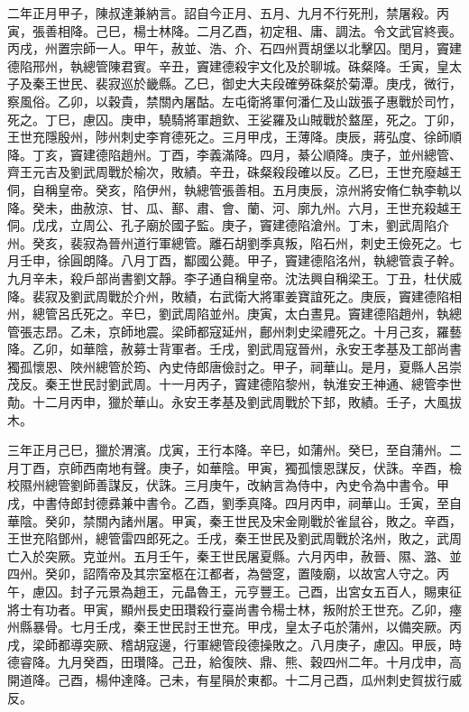 \begin{pinyinscope}
 二年正月甲子，陳叔達兼納言。詔自今正月、五月、九月不行死刑，禁屠殺。丙寅，張善相降。己巳，楊士林降。二月乙酉，初定租、庸、調法。令文武官終喪。丙戌，州置宗師一人。甲午，赦並、浩、介、石四州賈胡堡以北擊囚。閏月，竇建德陷邢州，執總管陳君賓。辛丑，竇建德殺宇文化及於聊城。硃粲降。壬寅，皇太子及秦王世民、裴寂巡於畿縣。乙巳，御史大夫段確勞硃粲於菊潭。庚戌，微行，察風俗。乙卯，以穀貴，禁關內屠酤。左屯衛將軍何潘仁及山跋張子惠戰於司竹，死之。丁巳，慮囚。庚申，驍騎將軍趙欽、王娑羅及山賊戰於盩厔，死之。丁卯，王世充隱殷州，陟州刺史李育德死之。三月甲戌，王薄降。庚辰，蔣弘度、徐師順降。丁亥，竇建德陷趙州。丁酉，李義滿降。四月，綦公順降。庚子，並州總管、齊王元吉及劉武周戰於榆次，敗績。辛丑，硃粲殺段確以反。乙巳，王世充廢越王侗，自稱皇帝。癸亥，陷伊州，執總管張善相。五月庚辰，涼州將安脩仁執李軌以降。癸未，曲赦涼、甘、瓜、鄯、肅、會、蘭、河、廓九州。六月，王世充殺越王侗。戊戌，立周公、孔子廟於國子監。庚子，竇建德陷滄州。丁未，劉武周陷介州。癸亥，裴寂為晉州道行軍總管。離石胡劉季真叛，陷石州，刺史王儉死之。七月壬申，徐圓朗降。八月丁酉，酅國公薨。甲子，竇建德陷洺州，執總管袁子幹。九月辛未，殺戶部尚書劉文靜。李子通自稱皇帝。沈法興自稱梁王。丁丑，杜伏威降。裴寂及劉武周戰於介州，敗績，右武衛大將軍姜寶誼死之。庚辰，竇建德陷相州，總管呂氏死之。辛巳，劉武周陷並州。庚寅，太白晝見。竇建德陷趙州，執總管張志昂。乙未，京師地震。梁師都寇延州，鄜州刺史梁禮死之。十月己亥，羅藝降。乙卯，如華陰，赦募士背軍者。壬戌，劉武周寇晉州，永安王孝基及工部尚書獨孤懷恩、陜州總管於筠、內史侍郎唐儉討之。甲子，祠華山。是月，夏縣人呂崇茂反。秦王世民討劉武周。十一月丙子，竇建德陷黎州，執淮安王神通、總管李世勣。十二月丙申，獵於華山。永安王孝基及劉武周戰於下邽，敗績。壬子，大風拔木。



 三年正月己巳，獵於渭濱。戊寅，王行本降。辛巳，如蒲州。癸巳，至自蒲州。二月丁酉，京師西南地有聲。庚子，如華陰。甲寅，獨孤懷恩謀反，伏誅。辛酉，檢校隰州總管劉師善謀反，伏誅。三月庚午，改納言為侍中，內史令為中書令。甲戌，中書侍郎封德彞兼中書令。乙酉，劉季真降。四月丙申，祠華山。壬寅，至自華陰。癸卯，禁關內諸州屠。甲寅，秦王世民及宋金剛戰於雀鼠谷，敗之。辛酉，王世充陷鄧州，總管雷四郎死之。壬戌，秦王世民及劉武周戰於洺州，敗之，武周亡入於突厥。克並州。五月壬午，秦王世民屠夏縣。六月丙申，赦晉、隰、潞、並四州。癸卯，詔隋帝及其宗室柩在江都者，為營窆，置陵廟，以故宮人守之。丙午，慮囚。封子元景為趙王，元晶魯王，元亨豐王。己酉，出宮女五百人，賜東征將士有功者。甲寅，顯州長史田瓚殺行臺尚書令楊士林，叛附於王世充。乙卯，瘞州縣暴骨。七月壬戌，秦王世民討王世充。甲戌，皇太子屯於蒲州，以備突厥。丙戌，梁師都導突厥、稽胡寇邊，行軍總管段德操敗之。八月庚子，慮囚。甲辰，時德睿降。九月癸酉，田瓚降。己丑，給復陜、鼎、熊、穀四州二年。十月戊申，高開道降。己酉，楊仲達降。己未，有星隕於東都。十二月己酉，瓜州刺史賀拔行威反。




\end{pinyinscope}
